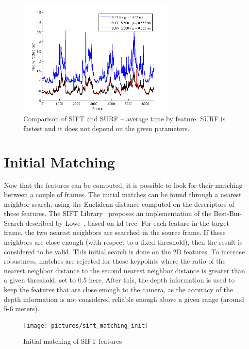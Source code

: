 \begin{figure}[H]
\begin{center}
\includegraphics[width=0.7\textwidth]{figures/stats_features_tbf}
\caption{Comparison of SIFT and SURF -- average time by feature. SURF is fastest and it does not depend on the given parameters.}
\end{center}
\end{figure}

\clearpage
\section{Initial Matching}

Now that the features can be computed, it is possible to look for their matching between a couple of frames. The initial matches can be found through a nearest neighbor search, using the Euclidean distance computed on the descriptors of these features.  
The SIFT Library~\cite{hess_sift} proposes an implementation of the Best-Bin-Search described by Lowe~\cite{lowe_2004_sift}, based on kd-tree. For each feature in the target frame, the two nearest neighbors are searched in the source frame. If these neighbors are close enough (with respect to a fixed threshold), then the result is considered to be valid. This initial search is done on the 2D features. To increase robustness, matches are rejected for those keypoints where the ratio of the nearest neighbor distance to the second nearest neighbor distance is greater than a given threshold, set to 0.5 here. After this, the depth information is used to keep the features that are close enough to the camera, as the accuracy of the depth information is not considered reliable enough above a given range (around 5-6 meters).

\begin{figure}[H]
\centering
\texttt{[image: pictures/sift\_matching\_init]}
\caption{Initial matching of SIFT features}
\end{figure}

